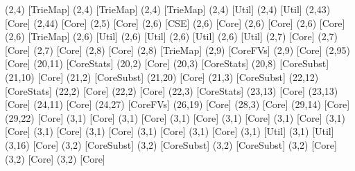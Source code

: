 {(2,4) [TrieMap] %
(2,4) [TrieMap] %
(2,4) [TrieMap] %
(2,4) [Util] %
(2,4) [Util] %
(2,43) [Core] %
(2,44) [Core] %
(2,5) [Core] %
(2,6) [CSE] %
(2,6) [Core] %
(2,6) [Core] %
(2,6) [Core] %
(2,6) [TrieMap] %
(2,6) [Util] %
(2,6) [Util] %
(2,6) [Util] %
(2,6) [Util] %
(2,7) [Core] %
(2,7) [Core] %
(2,7) [Core] %
(2,8) [Core] %
(2,8) [TrieMap] %
(2,9) [CoreFVs] %
(2,9) [Core] %
(2,95) [Core] %
(20,11) [CoreStats] %
(20,2) [Core] %
(20,3) [CoreStats] %
(20,8) [CoreSubst] %
(21,10) [Core] %
(21,2) [CoreSubst] %
(21,20) [Core] %
(21,3) [CoreSubst] %
(22,12) [CoreStats] %
(22,2) [Core] %
(22,2) [Core] %
(22,3) [CoreStats] %
(23,13) [Core] %
(23,13) [Core] %
(24,11) [Core] %
(24,27) [CoreFVs] %
(26,19) [Core] %
(28,3) [Core] %
(29,14) [Core] %
(29,22) [Core] %
(3,1) [Core] %
(3,1) [Core] %
(3,1) [Core] %
(3,1) [Core] %
(3,1) [Core] %
(3,1) [Core] %
(3,1) [Core] %
(3,1) [Core] %
(3,1) [Core] %
(3,1) [Core] %
(3,1) [Util] %
(3,1) [Util] %
(3,16) [Core] %
(3,2) [CoreSubst] %
(3,2) [CoreSubst] %
(3,2) [CoreSubst] %
(3,2) [Core] %
(3,2) [Core] %
(3,2) [Core] %
}
